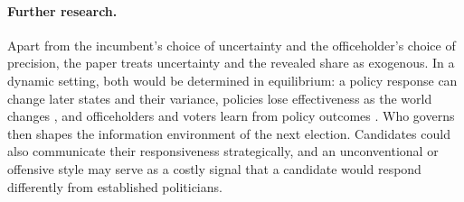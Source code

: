 \documentclass[12pt,letterpaper]{article}
\begin{document}
\paragraph{Further research.}
Apart from the incumbent's choice of uncertainty and the officeholder's choice of precision, the paper treats uncertainty and the revealed share as exogenous. In a dynamic setting, both would be determined in equilibrium: a policy response can change later states and their variance, policies lose effectiveness as the world changes \citep{CallanderMartin2017}, and officeholders and voters learn from policy outcomes \citep{Callander2011AER,Callander2011APSR,CallanderHummel2014}. Who governs then shapes the information environment of the next election. Candidates could also communicate their responsiveness strategically, and an unconventional or offensive style may serve as a costly signal that a candidate would respond differently from established politicians.
\end{document}
